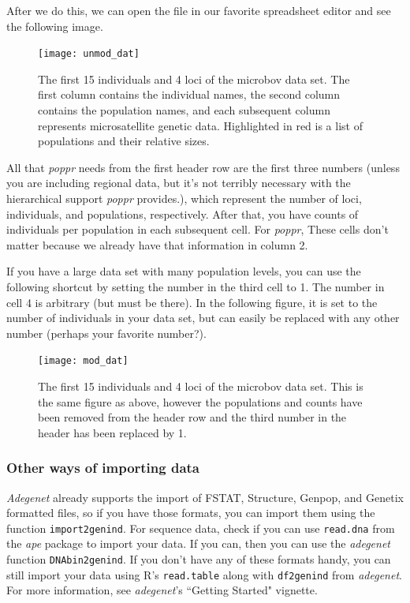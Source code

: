 \documentclass[letterpaper]{article}\usepackage[]{graphicx}\usepackage[]{color}
\newcommand{\tab}{\hspace*{1em}}
\begin{document}
After we do this, we can open the file in our favorite spreadsheet editor and see the following image.


\begin{figure}[h!]
  \centering
  \caption{\footnotesize \footnotesize The first 15 individuals and 4 loci of the microbov data set. The first column contains the individual names, the second column contains the population names, and each subsequent column represents microsatellite genetic data. Highlighted in red is a list of populations and their relative sizes.}
  \label{microbov unmodified}
\texttt{[image: unmod\_dat]}
\end{figure}

\newpage
All that \textit{poppr} needs from the first header row are the first three numbers (unless you are including regional data, but it's not terribly necessary with the hierarchical support \textit{poppr} provides.), which represent the number of loci, individuals, and populations, respectively. After that, you have counts of individuals per population in each subsequent cell. For \textit{poppr}, These cells don't matter because we already have that information in column 2.

If you have a large data set with many population levels, you can use the following shortcut by setting the number in the third cell to 1. The number in cell 4 is arbitrary (but must be there). In the following figure, it is set to the number of individuals in your data set, but can easily be replaced with any other number (perhaps your favorite number?). 

\begin{figure}[h!]
  \centering
  \caption{\footnotesize \footnotesize The first 15 individuals and 4 loci of the microbov data set. This is the same figure as above, however the populations and counts have been removed from the header row and the third number in the header has been replaced by 1.}
\texttt{[image: mod\_dat]}
\end{figure}


\subsubsection{Other ways of importing data}\label{intro:import:other}

\tab\tab \textit{Adegenet} already supports the import of FSTAT, Structure, Genpop, and Genetix formatted files, so if you have those formats, you can import them using the function \texttt{import2genind}. For sequence data, check if you can use \texttt{read.dna} from the \textit{ape} package to import your data. If you can, then you can use the \textit{adegenet} function \texttt{DNAbin2genind}. If you don't have any of these formats handy, you can still import your data using R's \texttt{read.table} along with \texttt{df2genind} from \textit{adegenet}. For more information, see \textit{adegenet}'s ``Getting Started" vignette.
\end{document}
